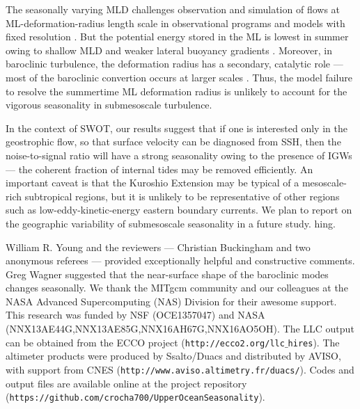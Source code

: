 \documentclass[grl]{agutex2015}
\begin{document}
\begin{article}
The seasonally varying MLD challenges observation and simulation of
flows at ML-deformation-radius length scale in observational programs and models with
fixed resolution \citep{buckingham_etal2016}. But the potential energy stored in the
ML is lowest in summer owing to shallow MLD and weaker lateral buoyancy
gradients \citep{callies_etal2015}. Moreover, in baroclinic turbulence, the deformation
radius has a secondary, catalytic role --- most of the baroclinic convertion occurs at
larger scales \citep{larichev_held1995,callies_etal2016}.
Thus, the model failure to resolve the summertime
ML deformation radius is unlikely to account for the vigorous seasonality in submesoscale
turbulence.


In the context of SWOT, our results suggest that if one is interested
only in the geostrophic flow, so that surface velocity can be diagnosed
from SSH, then the noise-to-signal ratio will have a strong seasonality owing
to the presence of IGWs --- the coherent fraction of internal tides may be removed
efficiently.
An important caveat is that the Kuroshio Extension may be typical of a mesoscale-rich
subtropical regions, but it is unlikely to be
representative of other regions such as low-eddy-kinetic-energy eastern boundary
currents.  We plan to report on the geographic variability of submesoscale
seasonality in a future study.
hing.




%

\begin{acknowledgments}
 William R. Young and the reviewers --- Christian Buckingham and two anonymous referees ---
  provided exceptionally helpful and constructive comments. Greg Wagner
 suggested that the near-surface shape of the baroclinic modes changes seasonally.
 We thank the MITgcm community and our colleagues at the NASA Advanced
Supercomputing (NAS) Division for their awesome support.
This research was funded by NSF (OCE1357047) and NASA (NNX13AE44G,NNX13AE85G,NNX16AH67G,NNX16AO5OH).
The LLC output can be obtained from the ECCO project (\texttt{http://ecco2.org/llc$\_$hires}). The altimeter products were produced by Ssalto/Duacs
and distributed by AVISO, with support from CNES (\texttt{http://www.aviso.altimetry.fr/duacs/}).
Codes and output files are available online at the project repository
 (\texttt{https://github.com/crocha700/UpperOceanSeasonality}).
\end{acknowledgments}


\end{article}
\end{document}
